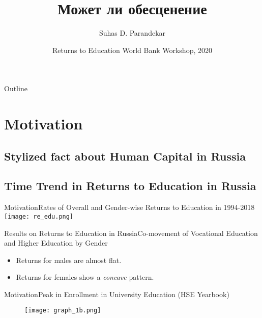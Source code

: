 \documentclass{beamer}
\title[dd?]
{Может ли обесценение}
\author{Suhas D. Parandekar}
\date[WB Workshop, 2020]{Returns to Education World Bank Workshop, 2020}
\begin{document}
	
\begin{frame}
	\titlepage
\end{frame}

\begin{frame}{Outline}
	\tableofcontents
\end{frame}
	
\section{Motivation}

\subsection{Stylized fact about Human Capital in Russia}
\subsection{Time Trend in Returns to Education in Russia}

\begin{frame}{Motivation}{Rates of Overall and Gender-wise Returns to Education in 1994-2018}
	\centering
	\texttt{[image: re\_edu.png]}
\end{frame}

\begin{frame}{Results on Returns to Education in Russia}{Co-movement of Vocational Education and Higher Education by Gender}
	\begin{figure}
		\centering
		\hfill
	\end{figure}
	\begin{itemize}
		\vspace*{-0.2in}
		\item Returns for males are almost flat.
		\item Returns for females show a \textit{concave} pattern.
	\end{itemize}
\end{frame}



\begin{frame}{Motivation}{Peak in Enrollment in University Education (HSE Yearbook)}
\begin{figure}
	\centering
	\vspace*{-0.2in}
	\hspace*{-0.3in}
	\texttt{[image: graph\_1b.png]}
\end{figure}
\end{frame}
	
\end{document}
